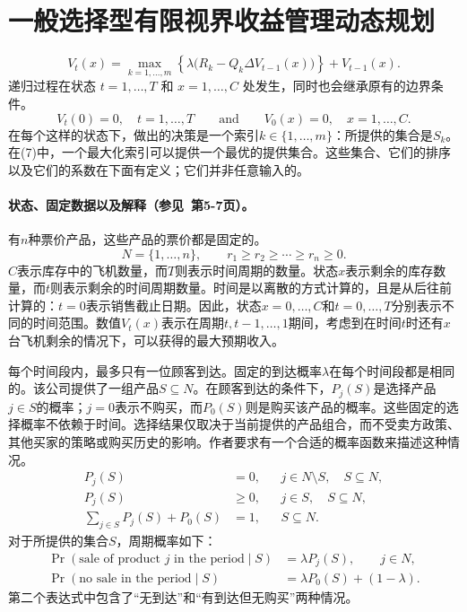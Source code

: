 \documentclass{article}
\begin{document}
\section*{一般选择型有限视界收益管理动态规划}

\begin{equation}
V_t(x)=\max_{k=1,\ldots,m}
\left\{\lambda\bigl(R_k-Q_k\Delta V_{t-1}(x)\bigr)\right\}
+V_{t-1}(x).
\tag{7}
\end{equation}
递归过程在状态 $t=1,\ldots,T$ 和 $x=1,\ldots,C$ 处发生，同时也会继承原有的边界条件。
\begin{equation}
V_t(0)=0,\quad t=1,\ldots,T
\qquad\text{and}\qquad
V_0(x)=0,\quad x=1,\ldots,C.
\tag{2}
\end{equation}
在每个这样的状态下，做出的决策是一个索引$k\in\{1,\ldots,m\}$：所提供的集合是$S_k$。在(7)中，一个最大化索引可以提供一个最优的提供集合。这些集合、它们的排序以及它们的系数在下面有定义；它们并非任意输入的。

\paragraph{状态、固定数据以及解释（参见~第5-7页）。}
有$n$种票价产品，这些产品的票价都是固定的。
\[
N=\{1,\ldots,n\},
\qquad r_1\ge r_2\ge\cdots\ge r_n\ge0.
\]
$C$表示库存中的飞机数量，而$T$则表示时间周期的数量。状态$x$表示剩余的库存数量，而$t$则表示剩余的时间周期数量。时间是以离散的方式计算的，且是从后往前计算的：$t=0$表示销售截止日期。因此，状态$x=0,\ldots,C$和$t=0,\ldots,T$分别表示不同的时间范围。数值$V_t(x)$表示在周期$t,t-1,\ldots,1$期间，考虑到在时间$t$时还有$x$台飞机剩余的情况下，可以获得的最大预期收入。

每个时间段内，最多只有一位顾客到达。固定的到达概率$\lambda$在每个时间段都是相同的。该公司提供了一组产品$S\subseteq N$。在顾客到达的条件下，$P_j(S)$是选择产品$j\in S$的概率；$j=0$表示不购买，而$P_0(S)$则是购买该产品的概率。这些固定的选择概率不依赖于时间。选择结果仅取决于当前提供的产品组合，而不受卖方政策、其他买家的策略或购买历史的影响。作者要求有一个合适的概率函数来描述这种情况。
\begin{align*}
P_j(S)&=0,
&&j\in N\setminus S,\quad S\subseteq N,\\
P_j(S)&\ge0,
&&j\in S,\quad S\subseteq N,\\
\sum_{j\in S}P_j(S)+P_0(S)&=1,
&&S\subseteq N.
\end{align*}
对于所提供的集合$S$，周期概率如下：
\begin{align*}
\Pr(\text{sale of product }j\text{ in the period}\mid S)
&=\lambda P_j(S),\qquad j\in N,\\
\Pr(\text{no sale in the period}\mid S)
&=\lambda P_0(S)+(1-\lambda).
\end{align*}
第二个表达式中包含了“无到达”和“有到达但无购买”两种情况。
\end{document}
